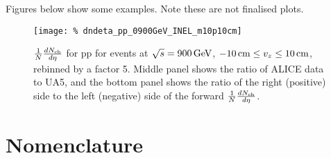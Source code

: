 \documentclass[11pt]{article}
\def\AlwaysText#1{\ifmmode\relax\text{#1}\else #1\fi}
\newcommand{\AbbrName}[1]{\AlwaysText{{\scshape #1}}}
\newcommand{\INEL}{\AbbrName{inel}}
\newcommand{\INELONE}{$\AbbrName{inel}>0$}
\newcommand{\NSD}{\AbbrName{nsd}}
\newcommand{\mult}[1][]{\ensuremath N_{\text{ch}#1}}
\newcommand{\dndeta}[1][]{{\ensuremath%
    \ifx|#1|\else\left.\fi%
    \frac{1}{N}\frac{d\mult{}}{d\eta}%
    \ifx|#1|\else\right|_{#1}\fi%
}}
\newcommand{\GeV}[1]{\unit[#1]{\AlwaysText{GeV}}}
\newcommand{\cm}[1]{\unit[#1]{\AlwaysText{cm}}}
\begin{document}
Figures below show some examples.  Note these are not finalised
plots. 

\begin{figure}[hbp]
  \centering
  \texttt{[image: \%
    dndeta\_pp\_0900GeV\_INEL\_m10p10cm]}
  \caption{$\dndeta$ for pp for \INEL{} events at $\sqrt{s}=\GeV{900}$,
    $\cm{-10}\le v_z\le\cm{10}$, rebinned by a factor 5.  Middle panel
    shows the ratio of ALICE data to UA5, and the bottom panel shows
    the ratio of the right (positive) side to the left (negative) side
    of the forward $\dndeta$.}
  \label{fig:1}
\end{figure} 

\iffalse
\begin{figure}[tbp]
  \centering
  \texttt{[image: \%
    dndeta\_0900GeV\_m10-p10cm\_rb05\_inelgt0]}
  \caption{$\dndeta$ for pp for \INELONE{} events at
    $\sqrt{s}=\GeV{900}$, $\cm{-10}\le v_z\le\cm{10}$, rebinned by a
    factor 5.  Comparisons to other measurements shown where
    applicable}
  \label{fig:2}
\end{figure} 
\begin{figure}[tbp]
  \centering
  \texttt{[image: \%
    dndeta\_0900GeV\_m10-p10cm\_rb05\_nsd]}
  \caption{$\dndeta$ for pp for \NSD{} events at $\sqrt{s}=\GeV{900}$,
    $\cm{-10}\le v_z\le\cm{10}$, rebinned by a factor 5.  Comparisons
    to other measurements shown where applicable}
  \label{fig:3}
\end{figure} 
\fi

\clearpage
\appendix 
\section{Nomenclature} 
\label{app:nomen}
\end{document}
